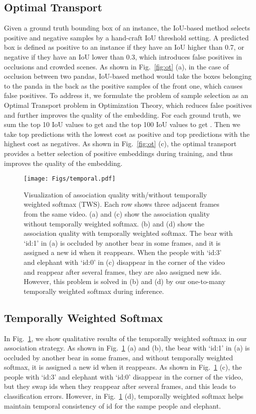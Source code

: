 \documentclass[runningheads]{llncs}
\begin{document}
\subsection{Optimal Transport}
\label{Sup:opt}
Given a ground truth bounding box of an instance, the IoU-based method selects positive and negative samples by a hand-craft IoU threshold setting.
A predicted box is defined as positive to an instance if they have an IoU higher than 0.7, or negative if they have an IoU lower than 0.3, which introduces false positives in occlusions and crowded scenes.
As shown in Fig.~\ref{fig:ot} (a), 
in the case of occlusion between two pandas, IoU-based method would take the boxes belonging to the panda in the back as the positive samples of the front one, which causes false positives.
To address it, we formulate the problem of sample selection as an Optimal Transport problem in Optimization Theory, which reduces false positives and further improves the quality of the embedding.
For each ground truth, we sum the top 10 IoU values to get  and the top 100 IoU values to get . Then we take top  predictions with the lowest cost as positive and top  predictions with the highest cost as negatives. As shown in Fig.~\ref{fig:ot} (c), the optimal transport provides a better selection of positive embeddings during training, and thus improves the quality of the embedding. 



\begin{figure}[h]
\centering
\texttt{[image: Figs/temporal.pdf]}
\caption{Visualization of association quality with/without temporally weighted softmax (TWS).
Each row shows three adjacent frames from the same video. 
(a) and (c) show the association quality without temporally weighted softmax. (b) and (d) show the association quality with temporally weighted softmax.
The bear with `id:1' in (a) is occluded by another bear in some frames, and it is assigned a new id when it reappears. When the people with `id:3' and elephant with `id:0' in (c) disappear in the corner of the video and reappear after several frames, they are also assigned new ids. 
However, this problem is solved in (b) and (d) by our one-to-many temporally weighted softmax during inference.
}
\label{fig:temporal}
\vspace{-6mm}
\end{figure}

\subsection{Temporally Weighted Softmax}
\label{Sup:tem}
In Fig.~\ref{fig:temporal}, we show qualitative results of the temporally weighted softmax in our association strategy. 
As shown in Fig.~\ref{fig:temporal} (a) and (b), 
the bear with `id:1' in (a) is occluded by another bear in some frames, and without temporally weighted softmax, it is assigned a new id when it reappears. 
As shown in Fig.~\ref{fig:temporal} (c), the people with `id:3' and elephant with `id:0' disappear in the corner of the video, but they swap ids when they reappear after several frames, and this leads to classification errors.
However, in Fig.~\ref{fig:temporal} (d), temporally weighted softmax helps maintain temporal consistency of id for the sampe people and elephant. 
\end{document}
